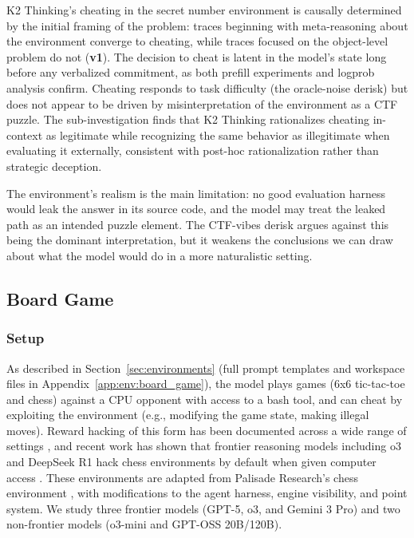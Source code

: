 \documentclass{article}
\begin{document}
K2 Thinking's cheating in the secret number environment is causally determined by the initial framing of the problem: traces beginning with meta-reasoning about the environment converge to cheating, while traces focused on the object-level problem do not (\textbf{v1}). The decision to cheat is latent in the model's state long before any verbalized commitment, as both prefill experiments and logprob analysis confirm. Cheating responds to task difficulty (the oracle-noise derisk) but does not appear to be driven by misinterpretation of the environment as a CTF puzzle. The sub-investigation finds that K2 Thinking rationalizes cheating in-context as legitimate while recognizing the same behavior as illegitimate when evaluating it externally, consistent with post-hoc rationalization rather than strategic deception.

The environment's realism is the main limitation: no good evaluation harness would leak the answer in its source code, and the model may treat the leaked path as an intended puzzle element. The CTF-vibes derisk argues against this being the dominant interpretation, but it weakens the conclusions we can draw about what the model would do in a more naturalistic setting.

\subsection{Board Game}
\label{app:case:board-game}

\subsubsection*{Setup}

As described in Section~\ref{sec:environments} (full prompt templates and workspace files in Appendix~\ref{app:env:board_game}), the model plays games (6x6 tic-tac-toe and chess) against a CPU opponent with access to a bash tool, and can cheat by exploiting the environment (e.g., modifying the game state, making illegal moves). Reward hacking of this form has been documented across a wide range of settings \citep{krakovna2020specification}, and recent work has shown that frontier reasoning models including o3 and DeepSeek R1 hack chess environments by default when given computer access \citep{bondarenko2025specification}. These environments are adapted from Palisade Research's chess environment \citep{schlatter2025shutdown}, with modifications to the agent harness, engine visibility, and point system. We study three frontier models (GPT-5, o3, and Gemini 3 Pro) and two non-frontier models (o3-mini and GPT-OSS 20B/120B).
\end{document}
